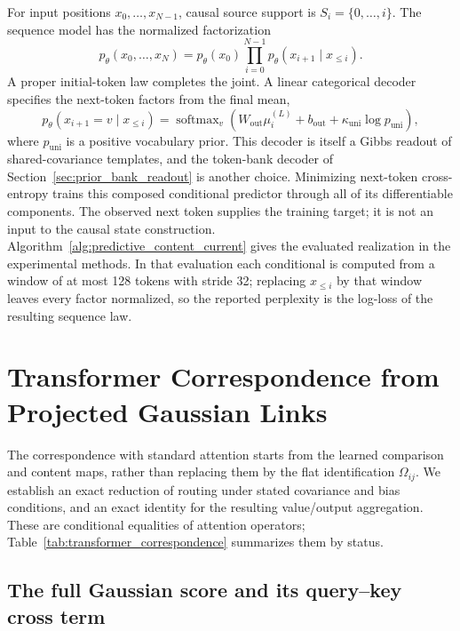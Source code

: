 \documentclass[twoside,11pt]{article}
\begin{document}
For input positions \(x_0,\ldots,x_{N-1}\), causal source support is \(S_i=\{0,\ldots,i\}\). The sequence model has the normalized factorization
\begin{equation}
p_\theta(x_0,\ldots,x_N)
=p_\theta(x_0)\prod_{i=0}^{N-1}p_\theta(x_{i+1}\mid x_{\le i}).
\label{eq:next_token_factorization_v2}
\end{equation}
A proper initial-token law completes the joint. A linear categorical decoder specifies the next-token factors from the final mean,
\begin{equation}
p_\theta(x_{i+1}=v\mid x_{\le i})
=\operatorname{softmax}_v\left(
W_{\mathrm{out}}\mu_i^{(L)}+b_{\mathrm{out}}
+\kappa_{\mathrm{uni}}\log p_{\mathrm{uni}}\right),
\label{eq:predictive_linear_decoder}
\end{equation}
where \(p_{\mathrm{uni}}\) is a positive vocabulary prior. This decoder is itself a Gibbs readout of shared-covariance templates, and the token-bank decoder of Section~\ref{sec:prior_bank_readout} is another choice. Minimizing next-token cross-entropy trains this composed conditional predictor through all of its differentiable components. The observed next token supplies the training target; it is not an input to the causal state construction. Algorithm~\ref{alg:predictive_content_current} gives the evaluated realization in the experimental methods. In that evaluation each conditional is computed from a window of at most 128 tokens with stride 32; replacing \(x_{\le i}\) by that window leaves every factor normalized, so the reported perplexity is the log-loss of the resulting sequence law.

\FloatBarrier
\section{Transformer Correspondence from Projected Gaussian Links}
\label{sec:transformer_comparison_summary}

The correspondence with standard attention starts from the learned comparison and content maps, rather than replacing them by the flat identification $\Omega_{ij}$. We establish an exact reduction of routing under stated covariance and bias conditions, and an exact identity for the resulting value/output aggregation. These are conditional equalities of attention operators; Table~\ref{tab:transformer_correspondence} summarizes them by status.

\subsection{The full Gaussian score and its query--key cross term}
\label{sec:dot_product_derivation}
\end{document}
